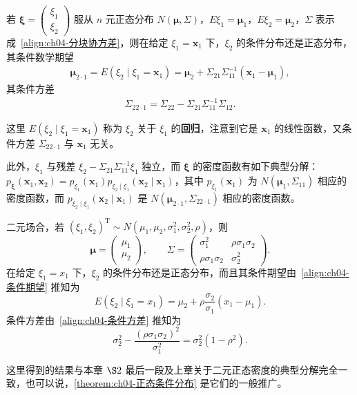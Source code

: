 \documentclass[../../main.tex]{subfiles}
\begin{document}
\begin{theorem}[正态条件分布仍为正态]\label{theorem:ch04-正态条件分布}
若 $\boldsymbol{\xi}=\begin{pmatrix}\xi_1\\\xi_2\end{pmatrix}$ 服从 $n$ 元正态分布 $N(\boldsymbol{\mu},\Sigma)$，$E\xi_1=\boldsymbol{\mu}_1$，$E\xi_2=\boldsymbol{\mu}_2$，$\Sigma$ 表示成~\eqref{align:ch04-分块协方差}，则在给定 $\xi_1=\boldsymbol{x}_1$ 下，$\xi_2$ 的条件分布还是正态分布，其条件数学期望
\begin{align}
\boldsymbol{\mu}_{2\cdot 1}=E(\xi_2\mid\xi_1=\boldsymbol{x}_1)=\boldsymbol{\mu}_2+\Sigma_{21}\Sigma_{11}^{-1}(\boldsymbol{x}_1-\boldsymbol{\mu}_1),\label{align:ch04-条件期望}
\end{align}
其条件方差
\begin{align}
\Sigma_{22\cdot 1}=\Sigma_{22}-\Sigma_{21}\Sigma_{11}^{-1}\Sigma_{12}.\label{align:ch04-条件方差}
\end{align}
\end{theorem}

这里 $E(\xi_2\mid\xi_1=\boldsymbol{x}_1)$ 称为 $\xi_2$ 关于 $\xi_1$ 的\textbf{回归}，注意到它是 $\boldsymbol{x}_1$ 的线性函数，又条件方差 $\Sigma_{22\cdot 1}$ 与 $\boldsymbol{x}_1$ 无关。

此外，$\xi_1$ 与残差 $\xi_2-\Sigma_{21}\Sigma_{11}^{-1}\xi_1$ 独立，而 $\boldsymbol{\xi}$ 的密度函数有如下典型分解：$p_{\boldsymbol{\xi}}(\boldsymbol{x}_1,\boldsymbol{x}_2)=p_{\xi_1}(\boldsymbol{x}_1)p_{\xi_2\mid\xi_1}(\boldsymbol{x}_2\mid\boldsymbol{x}_1)$，其中 $p_{\xi_1}(\boldsymbol{x}_1)$ 为 $N(\boldsymbol{\mu}_1,\Sigma_{11})$ 相应的密度函数，而 $p_{\xi_2\mid\xi_1}(\boldsymbol{x}_2\mid\boldsymbol{x}_1)$ 是 $N(\boldsymbol{\mu}_{2\cdot 1},\Sigma_{22\cdot 1})$ 相应的密度函数。

\begin{example}[二元正态的条件分布]\label{example:ch04-二元条件分布}
二元场合，若 $(\xi_1,\xi_2)^{\mathrm{T}}\sim N(\mu_1,\mu_2,\sigma_1^2,\sigma_2^2,\rho)$，则
\[
\boldsymbol{\mu}=\begin{pmatrix}\mu_1\\\mu_2\end{pmatrix},\qquad
\Sigma=\begin{pmatrix}\sigma_1^2&\rho\sigma_1\sigma_2\\\rho\sigma_1\sigma_2&\sigma_2^2\end{pmatrix}.
\]
在给定 $\xi_1=x_1$ 下，$\xi_2$ 的条件分布还是正态分布，而且其条件期望由~\eqref{align:ch04-条件期望} 推知为
\[
E(\xi_2\mid\xi_1=x_1)=\mu_2+\rho\frac{\sigma_2}{\sigma_1}(x_1-\mu_1).
\]
条件方差由~\eqref{align:ch04-条件方差} 推知为
\[
\sigma_2^2-\frac{(\rho\sigma_1\sigma_2)^2}{\sigma_1^2}=\sigma_2^2(1-\rho^2).
\]

这里得到的结果与本章 $\S 2$ 最后一段及上章关于二元正态密度的典型分解完全一致，也可以说，\cref{theorem:ch04-正态条件分布} 是它们的一般推广。
\end{example}
\end{document}
